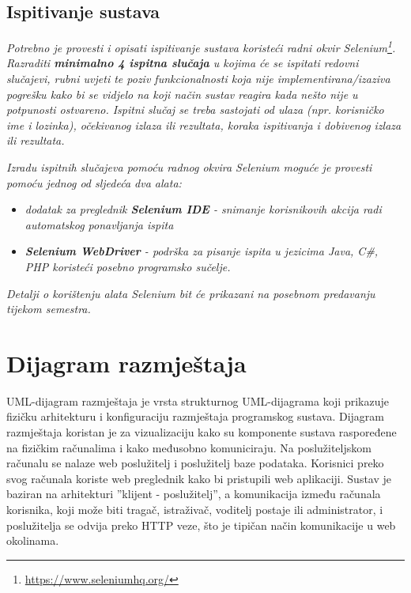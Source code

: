 			
			
			\subsection{Ispitivanje sustava}
			
			 \textit{Potrebno je provesti i opisati ispitivanje sustava koristeći radni okvir Selenium\footnote{\url{https://www.seleniumhq.org/}}. Razraditi \textbf{minimalno 4 ispitna slučaja} u kojima će se ispitati redovni slučajevi, rubni uvjeti te poziv funkcionalnosti koja nije implementirana/izaziva pogrešku kako bi se vidjelo na koji način sustav reagira kada nešto nije u potpunosti ostvareno. Ispitni slučaj se treba sastojati od ulaza (npr. korisničko ime i lozinka), očekivanog izlaza ili rezultata, koraka ispitivanja i dobivenog izlaza ili rezultata.\\ }
			 
			 \textit{Izradu ispitnih slučajeva pomoću radnog okvira Selenium moguće je provesti pomoću jednog od sljedeća dva alata:}
			 \begin{itemize}
			 	\item \textit{dodatak za preglednik \textbf{Selenium IDE} - snimanje korisnikovih akcija radi automatskog ponavljanja ispita	}
			 	\item \textit{\textbf{Selenium WebDriver} - podrška za pisanje ispita u jezicima Java, C\#, PHP koristeći posebno programsko sučelje.}
			 \end{itemize}
		 	\textit{Detalji o korištenju alata Selenium bit će prikazani na posebnom predavanju tijekom semestra.}
			
			\eject 
		
		
		\section{Dijagram razmještaja}

		UML-dijagram razmještaja je vrsta strukturnog UML-dijagrama 
		koji prikazuje fizičku arhitekturu i konfiguraciju 
		razmještaja programskog sustava. Dijagram razmještaja koristan je 
		za vizualizaciju kako su komponente sustava raspoređene na fizičkim 
		računalima i kako međusobno komuniciraju.
		Na poslužiteljskom računalu se 
		nalaze web poslužitelj i poslužitelj baze podataka. Korisnici preko svog računala koriste web
		preglednik kako bi pristupili web aplikaciji. Sustav je baziran na arhitekturi 
		”klijent - poslužitelj”, a komunikacija između računala korisnika, 
		koji može biti tragač, istraživač, voditelj postaje ili administrator, i poslužitelja se 
		odvija preko HTTP veze, što je tipičan način komunikacije u web okolinama.

